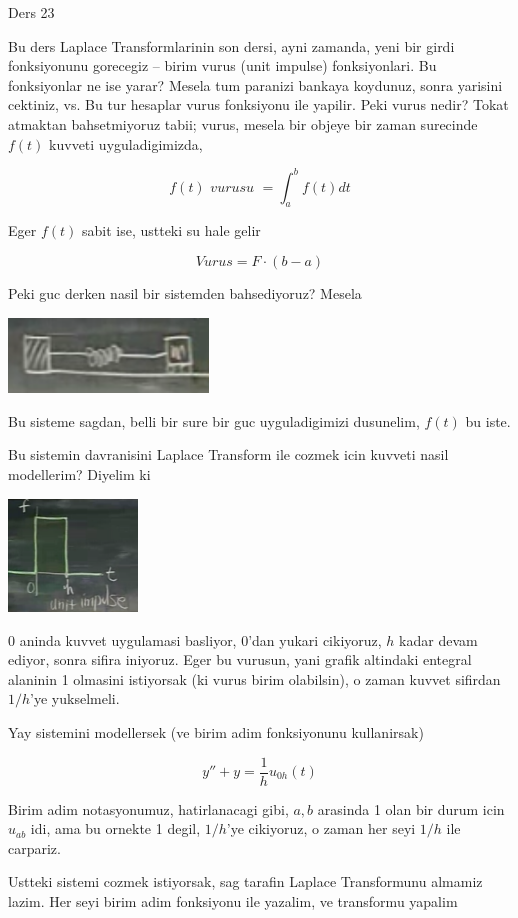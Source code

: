 \documentclass[12pt,fleqn]{article}
\begin{document}
Ders 23 

Bu ders Laplace Transformlarinin son dersi, ayni zamanda, yeni bir girdi
fonksiyonunu gorecegiz -- birim vurus (unit impulse) fonksiyonlari. Bu
fonksiyonlar ne ise yarar? Mesela tum paranizi bankaya koydunuz, sonra
yarisini cektiniz, vs. Bu tur hesaplar vurus fonksiyonu ile yapilir. Peki
vurus nedir? Tokat atmaktan bahsetmiyoruz tabii; vurus, mesela bir objeye
bir zaman surecinde $f(t)$ kuvveti uyguladigimizda,

\[ f(t) \textit{ vurusu } = \int _{a}^{b}f(t)dt \]

Eger $f(t)$ sabit ise, ustteki su hale gelir

\[ Vurus = F \cdot (b-a) \]

Peki guc derken nasil bir sistemden bahsediyoruz? Mesela

\includegraphics[height=2cm]{23_1.png}

Bu sisteme sagdan, belli bir sure bir guc uyguladigimizi dusunelim, $f(t)$
bu iste. 

Bu sistemin davranisini Laplace Transform ile cozmek icin kuvveti nasil
modellerim? Diyelim ki 

\includegraphics[height=3cm]{23_2.png}

0 aninda kuvvet uygulamasi basliyor, 0'dan yukari cikiyoruz, $h$ kadar
devam ediyor, sonra sifira iniyoruz. Eger bu vurusun, yani grafik altindaki
entegral alaninin 1 olmasini istiyorsak (ki vurus birim olabilsin), o zaman
kuvvet sifirdan $1/h$'ye yukselmeli. 

Yay sistemini modellersek (ve birim adim fonksiyonunu kullanirsak)

\[ y'' + y  = \frac{1}{h}u_{0h}(t) \]

Birim adim notasyonumuz, hatirlanacagi gibi, $a,b$ arasinda 1 olan bir
durum icin $u_{ab}$ idi, ama bu ornekte 1 degil, $1/h$'ye cikiyoruz, o
zaman her seyi $1/h$ ile carpariz.

Ustteki sistemi cozmek istiyorsak, sag tarafin Laplace Transformunu almamiz
lazim. Her seyi birim adim fonksiyonu ile yazalim, ve transformu yapalim
\end{document}
